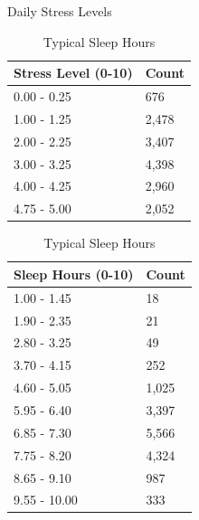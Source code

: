 \documentclass[runningheads]{llncs}
\begin{document}
\begin{enumerate}
\begin{table}[ht]
    \centering
    \begin{minipage}{0.45\linewidth}
        \centering
        \caption{Daily Stress Levels}\label{tab:stress_levels}
        \begin{tabular}{|l|l|}
            \hline
            \textbf{Stress Level (0-10)} & \textbf{Count} \\ 
            \hline
            0.00 - 0.25 & 676 \\ 
            1.00 - 1.25 & 2,478 \\ 
            2.00 - 2.25 & 3,407 \\ 
            3.00 - 3.25 & 4,398 \\ 
            4.00 - 4.25 & 2,960 \\ 
            4.75 - 5.00 & 2,052 \\ 
            \hline
        \end{tabular}
    \end{minipage}
    \hspace{0.05\linewidth} %
    \begin{minipage}{0.45\linewidth}
        \centering
        \caption{Typical Sleep Hours}\label{tab:sleep_hours}
        \begin{tabular}{|l|l|}
            \hline
            \textbf{Sleep Hours (0-10)} & \textbf{Count} \\ 
            \hline
            1.00 - 1.45 & 18 \\ 
            1.90 - 2.35 & 21 \\ 
            2.80 - 3.25 & 49 \\ 
            3.70 - 4.15 & 252 \\ 
            4.60 - 5.05 & 1,025 \\ 
            5.95 - 6.40 & 3,397 \\ 
            6.85 - 7.30 & 5,566 \\ 
            7.75 - 8.20 & 4,324 \\ 
            8.65 - 9.10 & 987 \\ 
            9.55 - 10.00 & 333 \\ 
            \hline
        \end{tabular}
    \end{minipage}
\end{table}


\clearpage

\begin{table}[ht]
    \centering
    

\end{table}
\end{enumerate}
\end{document}
